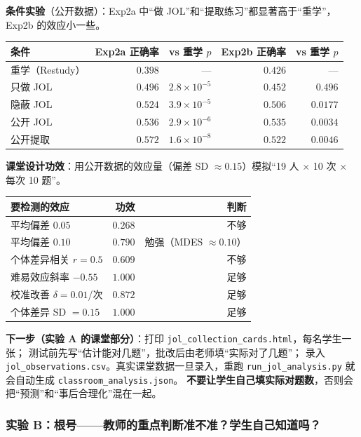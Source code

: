 \documentclass[UTF8,a4paper,11pt]{ctexart}
\begin{document}
\textbf{条件实验}（公开数据）：Exp2a 中“做 JOL”和“提取练习”都显著高于“重学”，Exp2b 的效应小一些。

\begin{center}
\begin{longtable}{@{}lrrrr@{}}
\toprule
\textbf{条件} & \textbf{Exp2a 正确率} & \textbf{vs 重学 $p$} & \textbf{Exp2b 正确率} & \textbf{vs 重学 $p$} \\
\midrule
重学（Restudy） & $0.398$ & --- & $0.426$ & --- \\
只做 JOL & $0.496$ & $2.8\times10^{-5}$ & $0.452$ & $0.496$ \\
隐蔽 JOL & $0.524$ & $3.9\times10^{-5}$ & $0.506$ & $0.0177$ \\
公开 JOL & $0.536$ & $2.9\times10^{-6}$ & $0.535$ & $0.0034$ \\
公开提取 & $0.572$ & $1.6\times10^{-8}$ & $0.522$ & $0.0046$ \\
\bottomrule
\end{longtable}
\end{center}

\textbf{课堂设计功效}：用公开数据的效应量（偏差 SD $\approx0.15$）模拟“19 人 $\times$ 10 次 $\times$ 每次 10 题”。

\begin{center}
\begin{longtable}{@{}p{6.2cm}rr@{}}
\toprule
\textbf{要检测的效应} & \textbf{功效} & \textbf{判断} \\
\midrule
平均偏差 $0.05$ & $0.268$ & 不够 \\
平均偏差 $0.10$ & $0.790$ & 勉强（MDES $\approx0.10$） \\
个体差异相关 $r=0.5$ & $0.609$ & 不够 \\
难易效应斜率 $-0.55$ & $1.000$ & 足够 \\
校准改善 $\delta=0.01$/次 & $0.872$ & 足够 \\
个体差异 SD $=0.15$ & $1.000$ & 足够 \\
\bottomrule
\end{longtable}
\end{center}

\textbf{下一步（实验 A 的课堂部分）}：打印 \texttt{jol\_collection\_cards.html}，每名学生一张；
测试前先写“估计能对几题”，批改后由老师填“实际对了几题”；
录入 \texttt{jol\_observations.csv}。真实课堂数据一旦录入，重跑
\texttt{run\_jol\_analysis.py} 就会自动生成 \texttt{classroom\_analysis.json}。
\textbf{不要让学生自己填实际对题数}，否则会把“预测”和“事后合理化”混在一起。

\subsubsection{实验 B：根号——教师的重点判断准不准？学生自己知道吗？}
\end{document}
